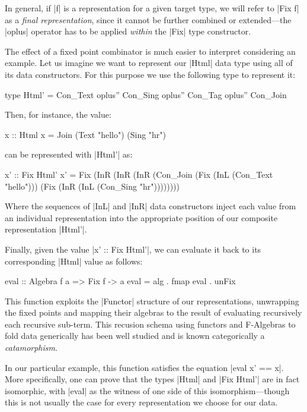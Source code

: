 In general, if |f| is a representation for a given target type, we will refer to
|Fix f| as a \emph{final representation}, since it cannot be further combined or
extended---the |oplus| operator has to be applied \emph{within} the |Fix| type
constructor.


The effect of a fixed point combinator is much easier to interpret considering
an example.
%
Let us imagine we want to represent our |Html| data type using all of its data
constructors.
%
For this purpose we use the following type to represent it:

\begin{code}
type Html' = Con_Text oplus'' Con_Sing oplus'' Con_Tag oplus'' Con_Join
\end{code}
%
Then, for instance, the value:

\begin{code}
  x :: Html
  x = Join (Text "hello") (Sing "hr")
\end{code}
%
can be represented with |Html'| as:

\begin{code}
  x' ::  Fix Html'
  x' =   Fix  (InR (InR (InR (Con_Join
              (Fix (InL (Con_Text "hello")))
              (Fix (InR (InL (Con_Sing "hr"))))))))
\end{code}
%
Where the sequences of |InL| and |InR| data constructors inject each value from
an individual representation into the appropriate position of our composite
representation |Html'|.


Finally, given the value |x' :: Fix Html'|, we can evaluate it back to its
corresponding |Html| value as follows:

\begin{code}
eval :: Algebra f a => Fix f -> a
eval = alg . fmap eval . unFix
\end{code}
%
This function exploits the |Functor| structure of our representations,
unwrapping the fixed points and mapping their algebras to the result of
evaluating recursively each recursive sub-term.
%
This recusion schema using functors and F-Algebras to fold data generically has
been well studied and is known categorically a \emph{catamorphism}.

In our particular example, this function satisfies the equation |eval x' == x|.
%
More specifically, one can prove that the types |Html| and |Fix Html'| are in
fact isomorphic, with |eval| as the witness of one side of this
isomorphism---though this is not usually the case for every representation we
choose for our data.


